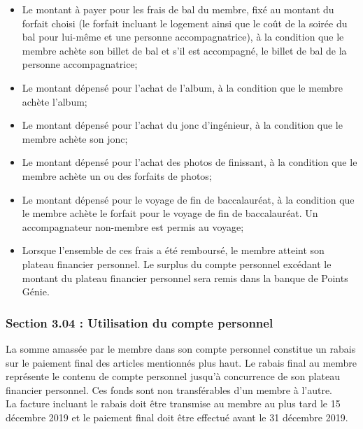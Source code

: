 \begin{itemize}
\item Le montant à payer pour les frais de bal du membre, fixé au montant du forfait choisi (le forfait incluant le logement ainsi que le coût de la soirée du bal pour lui-même et une personne accompagnatrice), à la condition que le membre achète son billet de bal et s’il est accompagné, le billet de bal de la personne accompagnatrice;
\item Le montant dépensé pour l’achat de l’album, à la condition que le membre achète l’album;
\item Le montant dépensé pour l’achat du jonc d’ingénieur, à la condition que le membre achète son jonc;
\item Le montant dépensé pour l’achat des photos de finissant, à la condition que le membre achète un ou des forfaits de photos;
\item Le montant dépensé pour le voyage de fin de baccalauréat, à la condition que le membre achète le forfait pour le voyage de fin de baccalauréat. Un accompagnateur non-membre est permis au voyage;
\item Lorsque l’ensemble de ces frais a été remboursé, le membre atteint son plateau financier personnel. Le surplus du compte personnel excédant le montant du plateau financier personnel sera remis dans la banque de Points Génie.
\end{itemize}

\subsubsection*{Section 3.04 : Utilisation du compte personnel}
La somme amassée par le membre dans son compte personnel constitue un rabais sur le paiement final des articles mentionnés plus haut. Le rabais final au membre représente le contenu de compte personnel jusqu’à concurrence de son plateau financier personnel. Ces fonds sont non transférables d’un membre à l’autre.\\

La facture incluant le rabais doit être transmise au membre au plus tard le 15 décembre 2019 et le paiement final doit être effectué avant le 31 décembre 2019.

